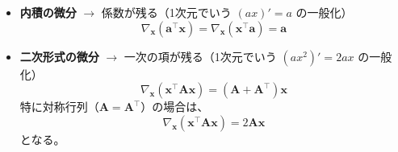 \documentclass[
  pandoc]{bxjsarticle}
\begin{document}
\begin{tcolorbox}[enhanced, colback=blue!2!white, colframe=blue!60!black, fonttitle=\bfseries, drop shadow, title={【復習とヒント】ベクトルによる微分の公式}]

\begin{itemize}
\item
  \textbf{内積の微分} \(\rightarrow\) 係数が残る（1次元でいう
  \((ax)' = a\) の一般化） \[
  \nabla_{\mathbf{x}} (\mathbf{a}^\top \mathbf{x}) = \nabla_{\mathbf{x}} (\mathbf{x}^\top \mathbf{a}) = \mathbf{a}
  \]
\item
  \textbf{二次形式の微分} \(\rightarrow\) 一次の項が残る（1次元でいう
  \((ax^2)' = 2ax\) の一般化） \[
  \nabla_{\mathbf{x}} (\mathbf{x}^\top \mathbf{A} \mathbf{x}) = (\mathbf{A} + \mathbf{A}^\top)\mathbf{x}
  \] 特に対称行列（\(\mathbf{A} = \mathbf{A}^\top\)）の場合は、
  \[\nabla_{\mathbf{x}} (\mathbf{x}^\top \mathbf{A} \mathbf{x}) = 2\mathbf{A}\mathbf{x}\]
  となる。
\end{itemize}

\end{tcolorbox}
\end{document}
